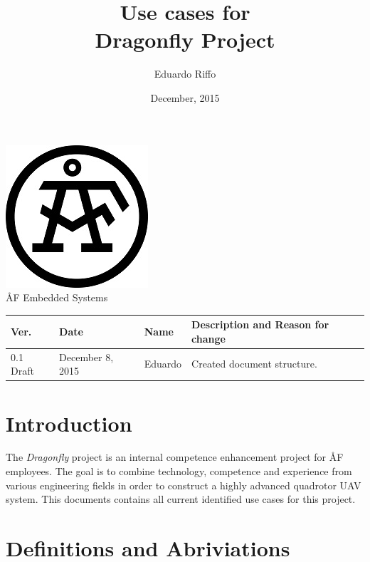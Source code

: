 \documentclass[a4paper]{article}
\title{ Use cases for\\ Dragonfly Project}
\author{Eduardo Riffo}
\date{December, 2015}         		%
\begin{document}

\maketitle                      	%

\begin{center}
\vspace{64pt}
\includegraphics[scale=1.6]{images/AF_Logotype20141_Black.png}
\vspace{16pt}
\\ \large ÅF Embedded Systems
\end{center}

\vspace{16pt}
\begin{tabular}{ l l l p{8.5cm} }
	Ver. & Date & Name & Description and Reason for change \\\hline
	0.1 Draft & December 8, 2015 & Eduardo & Created document structure.\\
\end{tabular}

\newpage

\tableofcontents					%

\newpage

\section{Introduction}

The \emph{Dragonfly} project is an internal competence enhancement project for ÅF employees. The goal is to combine technology, competence and experience from various engineering fields in order to construct a highly advanced quadrotor UAV system. This documents contains all current identified use cases for this project.

\section{Definitions and Abriviations}
\end{document}
